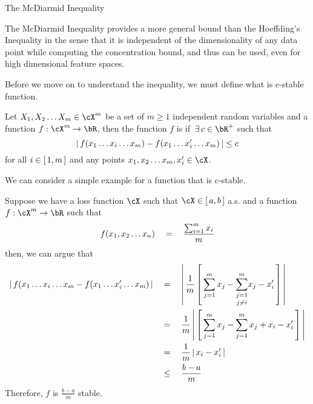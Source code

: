 \documentclass{article}
\begin{document}
\begin{ssection}{The McDiarmid Inequality}
	
	The McDiarmid Inequality provides a more general bound than the Hoeffding's Inequality in the sense that it is independent of the dimensionality of any data point while computing the concentration bound, and thus can be used, even for high dimensional feature spaces.
	
	Before we move on to understand the inequality, we must define what is c-stable function. \br
	
	\begin{definition}
		Let $X_1, X_2 \dots X_m \in \cX^m$ be a set of $m \ge 1$ independent random variables and a function $f : \cX^m \ra \bR$, then the function $f$ is  if $\qexists c \in \bR^+$ such that
		\begin{equation}
			\left| \,{f(x_1 \dots x_i \dots x_m) - f(x_1 \dots x_i' \dots x_m)}\, \right|	\le	c
		\end{equation}
		for all $i \in \left[\,{1, m}\,\right]$ and any points $x_1, x_2 \dots x_m, x_i' \in \cX$.
		\label{eq:c-stable}
	\end{definition} \br
	
	We can consider a simple example for a function that is c-stable. \br
	
	\begin{example}
		Suppose we have a loss function $\cX$ such that $\cX \in \brac{a, b}$ a.s. and a function $f : \cX^m \ra \bR$ such that
		\begin{align*}
			f(x_1, x_2 \dots x_n)	\quad = \quad	\frac{\sum_{i = 1}^m x_i}{m} 
		\end{align*}
		then, we can argue that
		\begin{align*}
			\left| \,{f(x_1 \dots x_i \dots x_m - f(x_1 \dots x_i' \dots x_m)}\, \right| & \quad = \quad	\left| \,{\frac{1}{m} \left[\,{\sum_{j = 1}^m x_j - \underset{j \ne i}{\sum_{j = 1}^{m}} x_j - x_i'}\,\right]}\, \right| \\
			                                                              & \quad = \quad	\frac{1}{m} \left| \,{\left[\,{\sum_{j = 1}^m x_j - \sum_{j = 1}^m x_j + x_i - x_i'}\,\right]}\, \right|                 \\
			                                                              & \quad = \quad	\frac{1}{m} \left| \,{x_i - x_i'}\, \right|                                                                  \\
			                                                              & \quad \le \quad	\frac{b - a}{m}                                                                              
		\end{align*}
		Therefore, $f$ is $\frac{b - a}{m}$ stable.
		\label{ex:hoeffding}
	\end{example}
	

\end{ssection}
\end{document}
